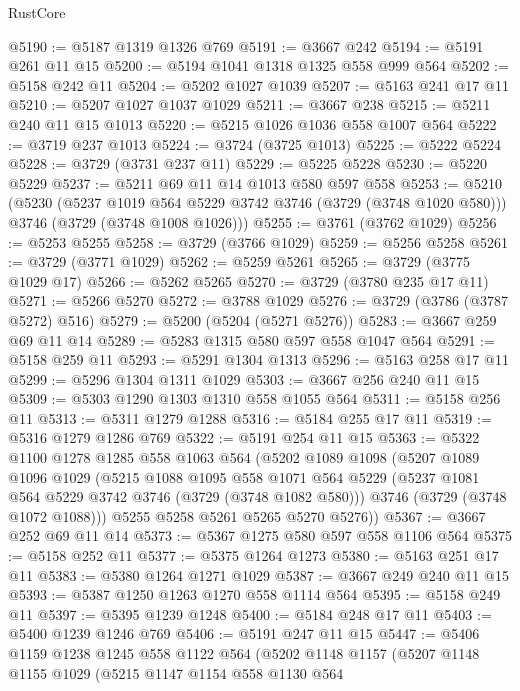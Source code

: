 \begin{lexlean}{RustCore}
\begin{coremodule}
@5190 := @5187 @1319 @1326 @769
@5191 := @3667 @242
@5194 := @5191 @261 @11 @15
@5200 := @5194 @1041 @1318 @1325 @558 @999 @564
@5202 := @5158 @242 @11
@5204 := @5202 @1027 @1039
@5207 := @5163 @241 @17 @11
@5210 := @5207 @1027 @1037 @1029
@5211 := @3667 @238
@5215 := @5211 @240 @11 @15 @1013
@5220 := @5215 @1026 @1036 @558 @1007 @564
@5222 := @3719 @237 @1013
@5224 := @3724 (@3725 @1013)
@5225 := @5222 @5224
@5228 := @3729 (@3731 @237 @11)
@5229 := @5225 @5228
@5230 := @5220 @5229
@5237 := @5211 @69 @11 @14 @1013 @580 @597 @558
@5253 := @5210
    (@5230
      (@5237 @1019 @564 @5229 @3742 @3746 (@3729 (@3748 @1020 @580)))
      @3746
      (@3729 (@3748 @1008 @1026)))
@5255 := @3761 (@3762 @1029)
@5256 := @5253 @5255
@5258 := @3729 (@3766 @1029)
@5259 := @5256 @5258
@5261 := @3729 (@3771 @1029)
@5262 := @5259 @5261
@5265 := @3729 (@3775 @1029 @17)
@5266 := @5262 @5265
@5270 := @3729 (@3780 @235 @17 @11)
@5271 := @5266 @5270
@5272 := @3788 @1029
@5276 := @3729 (@3786 (@3787 @5272) @516)
@5279 := @5200 (@5204 (@5271 @5276))
@5283 := @3667 @259 @69 @11 @14
@5289 := @5283 @1315 @580 @597 @558 @1047 @564
@5291 := @5158 @259 @11
@5293 := @5291 @1304 @1313
@5296 := @5163 @258 @17 @11
@5299 := @5296 @1304 @1311 @1029
@5303 := @3667 @256 @240 @11 @15
@5309 := @5303 @1290 @1303 @1310 @558 @1055 @564
@5311 := @5158 @256 @11
@5313 := @5311 @1279 @1288
@5316 := @5184 @255 @17 @11
@5319 := @5316 @1279 @1286 @769
@5322 := @5191 @254 @11 @15
@5363 := @5322
    @1100
    @1278
    @1285
    @558
    @1063
    @564
    (@5202
      @1089
      @1098
      (@5207
        @1089
        @1096
        @1029
        (@5215
          @1088
          @1095
          @558
          @1071
          @564
          @5229
          (@5237 @1081 @564 @5229 @3742 @3746 (@3729 (@3748 @1082 @580)))
          @3746
          (@3729 (@3748 @1072 @1088)))
        @5255
        @5258
        @5261
        @5265
        @5270
        @5276))
@5367 := @3667 @252 @69 @11 @14
@5373 := @5367 @1275 @580 @597 @558 @1106 @564
@5375 := @5158 @252 @11
@5377 := @5375 @1264 @1273
@5380 := @5163 @251 @17 @11
@5383 := @5380 @1264 @1271 @1029
@5387 := @3667 @249 @240 @11 @15
@5393 := @5387 @1250 @1263 @1270 @558 @1114 @564
@5395 := @5158 @249 @11
@5397 := @5395 @1239 @1248
@5400 := @5184 @248 @17 @11
@5403 := @5400 @1239 @1246 @769
@5406 := @5191 @247 @11 @15
@5447 := @5406
    @1159
    @1238
    @1245
    @558
    @1122
    @564
    (@5202
      @1148
      @1157
      (@5207
        @1148
        @1155
        @1029
        (@5215
          @1147
          @1154
          @558
          @1130
          @564

\end{coremodule}
\end{lexlean}
